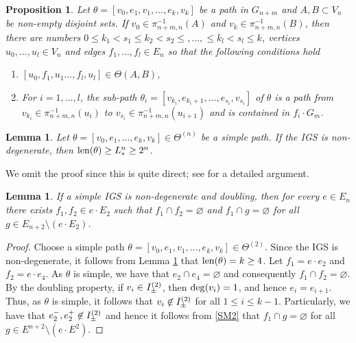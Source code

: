 \documentclass{amsart}
\newcommand{\len}{{\rm len}}
\newcommand{\degr}{{\rm deg}}
\newtheorem{lemma}[equation]{Lemma}
\newtheorem{proposition}[equation]{Proposition}
\numberwithin{equation}{section}
\theoremstyle{definition}
\theoremstyle{remark}
\begin{document}
\begin{proposition}\label{Proposition: Path lift}
    Let \(\theta=[v_0,e_1,v_1,\dots ,e_k,v_k]\) be a path in \(G_{n+m}\) and \(A,B\subset V_n\) be non-empty disjoint sets. If \(v_0\in \pi_{n+m,n}^{-1}(A)\) and \(v_k\in \pi_{n+m,n}^{-1}(B)\), then there are numbers \(0\leq k_1 < s_1 \leq k_2 < s_2\leq,\dots,\leq k_l < s_l\leq k\), vertices \(u_0,\dots ,u_l\in V_n\) and edges \(f_1,\dots ,f_l\in E_n\) so that the following conditions hold
    \begin{enumerate}
        \item \([u_0,f_1,u_1\dots,f_l,u_l]\in \Theta(A,B)\),
        \item For $i=1,\dots,l$, the sub-path \(\theta_i=[v_{k_i},e_{k_i+1},\dots ,e_{s_i}, v_{s_i}]\) of \(\theta\) is a path from  \(v_{k_i}\in\pi_{n+m,n}^{-1}(u_i)\) to \(v_{s_i}\in\pi_{n+m,n}^{-1}(u_{i+1})\) and is contained in \(f_i\cdot G_m\).
    \end{enumerate}
\end{proposition}



\begin{lemma}\label{Lemma: Non-degenerate path length}
    Let \(\theta=[v_0,e_1,\ldots,e_k,v_k]\in\Theta^{(n)}\) be a simple path. If the IGS is non-degenerate, then \(\len(\theta)\geq L_*^n\ge 2^n\). 
\end{lemma}
We omit the proof since this is quite direct; see \cite[Lemma 3.18]{anttila2024constructions} for a detailed argument. 

\begin{lemma}\label{Lemma: Interior edge}
If a simple IGS is non-degenerate and doubling, then for every \(e\in E_n\) there exists \(f_1,f_2\in e\cdot E_2\) such that \(f_1\cap f_2=\varnothing\) and \(f_1\cap g=\varnothing\) for all \(g\in E_{n+2}\setminus (e\cdot E_2)\).
\end{lemma}
\begin{proof}
    Choose a simple path \(\theta=[v_0,e_1,v_1,\ldots,e_k,v_k]\in\Theta^{(2)}\). Since the IGS is non-degenerate, it follows from Lemma \ref{Lemma: Non-degenerate path length} that \(\len(\theta)=k\geq 4\). Let \(f_1=e\cdot e_2\) and \(f_2=e\cdot e_4\). As \(\theta\) is simple, we have that \(e_2\cap e_4=\varnothing\) and consequently \(f_1\cap f_2=\varnothing\). By the doubling property, if \(v_i\in I^{\smash{(2)}}_\pm\), then \(\degr(v_i)=1\), and hence \(e_i=e_{i+1}\). Thus, as \(\theta\) is simple, it follows that \(v_i\not\in I_\pm^{\smash{(2)}}\) for all \(1\leq i\leq k-1\). Particularly, we have that \(e_2^-,e_2^+\not\in I^{\smash{(2)}}_\pm\) and hence it follows from \ref{SM2} that \(f_1\cap g =\varnothing\) for all \(g\in E^{n+2}\setminus(e\cdot E^2)\).
\end{proof}
\end{document}
